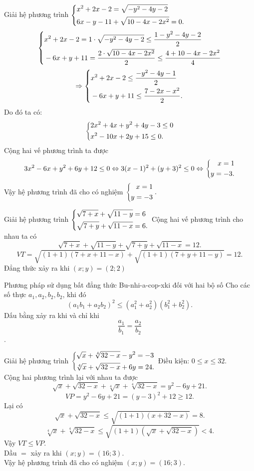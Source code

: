 \begin{ex}%
Giải hệ phương trình $\left\{\begin{aligned}&x^2+2x-2=\sqrt{-y^2-4y-2}\\&6x-y-11+\sqrt{10-4x-2x^2}=0.\end{aligned}\right.$
\loigiai
{
$$\left\{\begin{aligned}&x^2+2x-2=1 \cdot \sqrt{-y^2-4y-2} \leq \dfrac{1-y^2-4y-2}{2}\\&-6x+y+11=\dfrac{2\cdot\sqrt{10-4x-2x^2}}{2} \leq \dfrac{4+10-4x-2x^2}{4}\end{aligned}\right.$$
$$\Rightarrow \left\{\begin{aligned}&x^2+2x-2 \leq \dfrac{-y^2-4y-1}{2}\\&-6x+y+11 \leq \dfrac{7-2x-x^2}{2}.\end{aligned}\right.$$ Do đó ta có:
$$\left\{\begin{aligned}&2x^2+4x+y^2+4y-3 \leq 0 \\ &x^2-10x+2y+15 \leq 0.\end{aligned}\right.$$ Cộng hai vế phương trình ta được
$$3x^2-6x+y^2+6y+12 \leq 0 \Leftrightarrow 3(x-1)^2+(y+3)^2 \leq 0 \Leftrightarrow \left\{\begin{aligned}x=1\\y=-3.\end{aligned}\right.$$
Vậy hệ phương trình đã cho có nghiệm $\left\{\begin{aligned}x=1\\y=-3\end{aligned}\right..$
}
\end{ex}

\begin{ex}%
Giải hệ phương trình $\left\{\begin{aligned}&\sqrt{7+x}+\sqrt{11-y}=6 \\ &\sqrt{7+y}+\sqrt{11-x}=6.\end{aligned}\right.$
\loigiai
{Cộng hai vế phương trình cho nhau ta có
$$\sqrt{7+x}+\sqrt{11-y} + \sqrt{7+y}+\sqrt{11-x}=12.$$
$$VT= \sqrt{(1+1)(7+x+11-x)}+\sqrt{(1+1)(7+y+11-y)}=12.$$
Đẳng thức xảy ra khi $(x;y)=(2;2)$
}
\end{ex}

\begin{dang}{Phương pháp sử dụng bất đẳng thức Bu-nhi-a-cop-xki đối với hai bộ số}
   Cho các số thực $a_1 ,a_2, b_2, b_2$, khi đó $$(a_1 b_1 + a_2 b_2)^2 \leq (a_1^2+a_2^2)(b_1^2+b_2^2).$$
Dấu bằng xảy ra khi và chỉ khi $$\dfrac{a_1}{b_1}= \dfrac{a_2}{b_2}$$.
\end{dang}

\begin{ex}%
Giải hệ phương trình $\left\{\begin{aligned}&\sqrt{x}+\sqrt[4]{32-x}-y^2 =-3\\& \sqrt[4]{x}+ \sqrt{32-x} + 6y=24.\end{aligned}\right.$
\loigiai
{Điều kiện: $0 \leq x \leq 32$.\\
Cộng hai phương trình lại với nhau ta được
 $$\sqrt{x}+ \sqrt{32-x}+\sqrt[4]{x}+\sqrt[4]{32-x}=y^2-6y+21.$$
 $$VP=y^2-6y+21=(y-3)^2+12 \geq 12.$$
Lại có
$$\sqrt{x}+\sqrt{32-x} \leq \sqrt{(1+1)(x+32-x)}=8.$$
$$\sqrt[4]{x}+\sqrt[4]{32-x} \leq \sqrt{(1+1)(\sqrt{x}+\sqrt{32-x})}<4.$$
Vậy $VT \leq VP$.\\
Dầu $=$ xảy ra khi $(x;y)=(16;3)$.\\
Vậy hệ phương trình đã cho có nghiệm $(x;y)=(16;3)$.
}
\end{ex}

